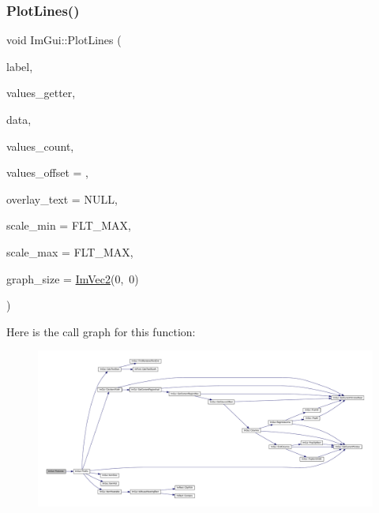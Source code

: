 \subsubsection{\texorpdfstring{Plot\+Lines()}{PlotLines()}\hspace{0.1cm}{\footnotesize\ttfamily [2/2]}}
{\footnotesize\ttfamily void Im\+Gui\+::\+Plot\+Lines (\begin{DoxyParamCaption}\item[{const char $\ast$}]{label,  }\item[{float($\ast$)(void $\ast$data, int idx)}]{values\+\_\+getter,  }\item[{void $\ast$}]{data,  }\item[{int}]{values\+\_\+count,  }\item[{int}]{values\+\_\+offset = {},  }\item[{const char $\ast$}]{overlay\+\_\+text = {\ttfamily NULL},  }\item[{float}]{scale\+\_\+min = {\ttfamily FLT\+\_\+MAX},  }\item[{float}]{scale\+\_\+max = {\ttfamily FLT\+\_\+MAX},  }\item[{\mbox{\hyperlink{struct_im_vec2}{Im\+Vec2}}}]{graph\+\_\+size = {\ttfamily \mbox{\hyperlink{struct_im_vec2}{Im\+Vec2}}(0,~0)} }\end{DoxyParamCaption})}

Here is the call graph for this function\+:
\nopagebreak
\begin{figure}[H]
\begin{center}
\leavevmode
\includegraphics[width=350pt]{namespace_im_gui_a94a2645d45c96da35b834dc7db93a9f1_cgraph}
\end{center}
\end{figure}
\mbox{\label{namespace_im_gui_a017db69016de97685aec978e504dc96d}} 
